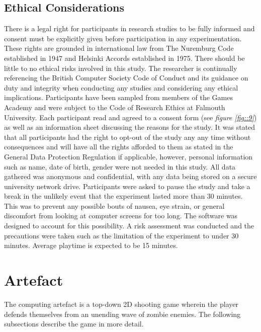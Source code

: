 \documentclass[journal]{IEEEtran}
\begin{document}
\subsection{Ethical Considerations}
There is a legal right for participants in research studies to be fully informed and consent must be explicitly given before participation in any experimentation. These rights are grounded in international law from The Nuremburg Code established in 1947 and Helsinki Accords established in 1975. There should be little to no ethical risks involved in this study. The researcher is continually referencing the British Computer Society Code of Conduct \cite{bcs} and its guidance on duty and integrity when conducting any studies and considering any ethical implications. Participants have been sampled from members of the Games Academy and were subject to the Code of Research Ethics at Falmouth University. Each participant read and agreed to a consent form (see \textit{figure \ref{fig::9}}) as well as an information sheet discussing the reasons for the study. It was stated that all participants had the right to opt-out of the study any any time without consequences and will have all the rights afforded to them as stated in the General Data Protection Regulation \cite{gdpr} if applicable, however, personal information such as name, date of birth, gender were not needed in this study. All data gathered was anonymous and confidential, with any data being stored on a secure university network drive. Participants were asked to pause the study and take a break in the unlikely event that the experiment lasted more than 30 minutes. This was to prevent any possible bouts of nausea, eye strain, or general discomfort from looking at computer screens for too long. The software was designed to account for this possibility. A risk assessment was conducted and the precautions were taken such as the limitation of the experiment to under 30 minutes. Average playtime is expected to be 15 minutes.



\section{Artefact}
The computing artefact is a top-down 2D shooting game wherein the player defends themselves from an unending wave of zombie enemies. The following subsections describe the game in more detail.
\end{document}
